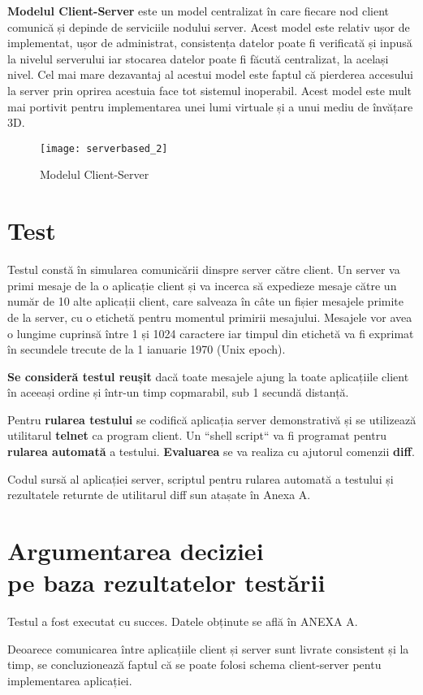 \textbf{Modelul Client-Server} este un model centralizat în care fiecare nod client comunică și depinde de serviciile nodului server. Acest model este relativ ușor de implementat, ușor de administrat, consistența datelor poate fi verificată și inpusă la nivelul serverului iar stocarea datelor poate fi făcută centralizat, la același nivel. Cel mai mare dezavantaj al acestui model este faptul că pierderea accesului la server prin oprirea acestuia face tot sistemul inoperabil. Acest model este mult mai portivit pentru implementarea unei lumi virtuale și a unui mediu de învățare 3D. 

\begin{figure}[h]
    \centering
    \texttt{[image: serverbased\_2]}
    \caption{Modelul Client-Server}
    \label{fig:imag5}
\end{figure}

\section{Test}

\par Testul constă în simularea comunicării dinspre server către client. Un server va primi mesaje de la o aplicație  client și va incerca să expedieze mesaje către un număr de 10 alte aplicații client, care salveaza în câte un fișier mesajele primite de la server, cu o etichetă pentru momentul primirii mesajului. Mesajele vor avea o lungime cuprinsă între 1 și 1024 caractere iar timpul din etichetă va fi exprimat în secundele trecute de la 1 ianuarie 1970  (Unix epoch).

\par \textbf{Se consideră testul reușit} dacă toate mesajele ajung la toate aplicațiile client în aceeași ordine și într-un timp copmarabil, sub 1 secundă distanță.
\par Pentru \textbf{rularea testului} se codifică aplicația  server demonstrativă și se utilizează utilitarul \textbf{telnet} ca program client. Un ``shell script`` va fi programat pentru \textbf{rularea automată} a testului. \textbf{Evaluarea} se va realiza cu ajutorul comenzii \textbf{diff}. 
\par Codul sursă al aplicației server, scriptul pentru rularea automată a testului și rezultatele returnte de utilitarul diff sun atașate în Anexa A.

\section{Argumentarea deciziei \\ pe baza rezultatelor testării}

\par Testul a fost executat cu succes. Datele obținute se află în ANEXA A.
\par Deoarece comunicarea între aplicațiile client și server sunt livrate consistent și la timp, se concluzionează faptul că se poate folosi schema client-server pentu implementarea aplicației.
